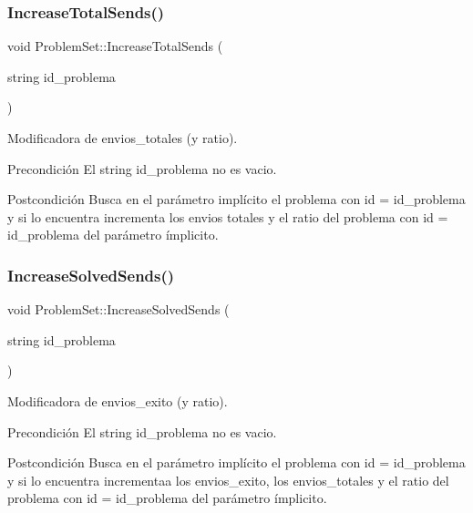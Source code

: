 \subsubsection{\texorpdfstring{Increase\+Total\+Sends()}{IncreaseTotalSends()}}
{\footnotesize\ttfamily void Problem\+Set\+::\+Increase\+Total\+Sends (\begin{DoxyParamCaption}\item[{string}]{id\+\_\+problema }\end{DoxyParamCaption})}



Modificadora de envios\+\_\+totales (y ratio). 

\begin{DoxyPrecond}{Precondición}
El string id\+\_\+problema no es vacio. 
\end{DoxyPrecond}
\begin{DoxyPostcond}{Postcondición}
Busca en el parámetro implícito el problema con id = id\+\_\+problema y si lo encuentra incrementa los envios totales y el ratio del problema con id = id\+\_\+problema del parámetro ímplicito. 
\end{DoxyPostcond}
\mbox{\label{class_problem_set_a720c17f1bd3d8fd5628e0015ac734b07}} 
\subsubsection{\texorpdfstring{Increase\+Solved\+Sends()}{IncreaseSolvedSends()}}
{\footnotesize\ttfamily void Problem\+Set\+::\+Increase\+Solved\+Sends (\begin{DoxyParamCaption}\item[{string}]{id\+\_\+problema }\end{DoxyParamCaption})}



Modificadora de envios\+\_\+exito (y ratio). 

\begin{DoxyPrecond}{Precondición}
El string id\+\_\+problema no es vacio. 
\end{DoxyPrecond}
\begin{DoxyPostcond}{Postcondición}
Busca en el parámetro implícito el problema con id = id\+\_\+problema y si lo encuentra incrementaa los envios\+\_\+exito, los envios\+\_\+totales y el ratio del problema con id = id\+\_\+problema del parámetro ímplicito. 
\end{DoxyPostcond}
\mbox{\label{class_problem_set_adac211be4426d3b9395de055bbf43131}} 
